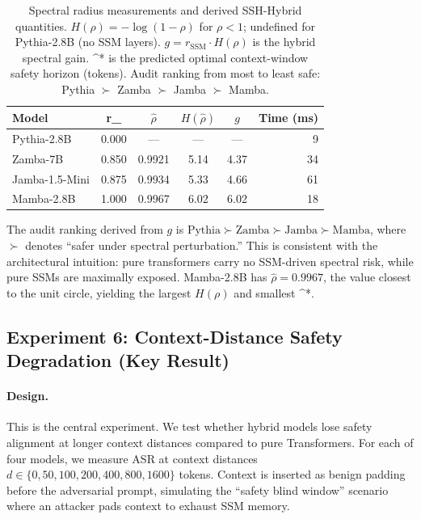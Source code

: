 \documentclass{article}
\newcommand{\rSSM}{r_{\mathrm{SSM}}}
\newcommand{\deltaStar}{\Delta^{*}}
\begin{document}
\begin{table}[ht]
  \centering
  \caption{Spectral radius measurements and derived SSH-Hybrid quantities.
           $H(\rho) = -\log(1-\rho)$ for $\rho < 1$; undefined for Pythia-2.8B
           (no SSM layers).
           $g = \rSSM \cdot H(\rho)$ is the hybrid spectral gain.
           \deltaStar{} is the predicted optimal context-window safety horizon (tokens).
           Audit ranking from most to least safe: Pythia $\succ$ Zamba $\succ$ Jamba $\succ$
           Mamba.}
  \label{tab:spectral}
  \setlength{\tabcolsep}{7pt}
  \begin{tabular}{lccccr}
    \toprule
    \textbf{Model} & \rSSM{} & $\hat{\rho}$ & $H(\hat{\rho})$ & $g$ &
      \textbf{Time (ms)} \\
    \midrule
    Pythia-2.8B    & 0.000 & ---    & ---  & ---  &  9 \\
    Zamba-7B       & 0.850 & 0.9921 & 5.14 & 4.37 & 34 \\
    Jamba-1.5-Mini & 0.875 & 0.9934 & 5.33 & 4.66 & 61 \\
    Mamba-2.8B     & 1.000 & 0.9967 & 6.02 & 6.02 & 18 \\
    \bottomrule
  \end{tabular}
\end{table}

The audit ranking derived from $g$ is
$\text{Pythia} \succ \text{Zamba} \succ \text{Jamba} \succ \text{Mamba}$,
where $\succ$ denotes ``safer under spectral perturbation.''
This is consistent with the architectural intuition: pure transformers carry no SSM-driven
spectral risk, while pure SSMs are maximally exposed.
Mamba-2.8B has $\hat{\rho} = 0.9967$, the value closest to the unit circle, yielding the
largest $H(\rho)$ and smallest \deltaStar{}.

\subsection{Experiment 6: Context-Distance Safety Degradation (Key Result)}
\label{sec:exp6}

\paragraph{Design.}
This is the central experiment. We test whether hybrid models lose safety alignment
at longer context distances compared to pure Transformers. For each of four models,
we measure ASR at context distances $d \in \{0, 50, 100, 200, 400, 800, 1600\}$ tokens.
Context is inserted as benign padding before the adversarial prompt, simulating the
``safety blind window'' scenario where an attacker pads context to exhaust SSM memory.
\end{document}
